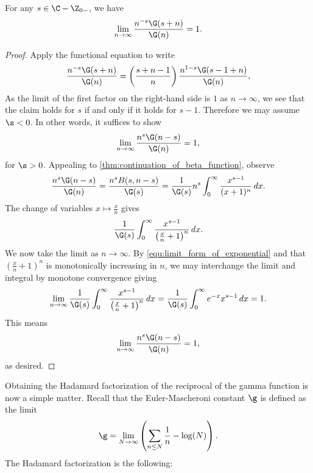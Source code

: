 \documentclass[12pt]{article}
\begin{document}
      \begin{lemma}\label{lem:Hadamard_factorization_of_gamma_function_lemma}
        For any \(s \in \C-\Z_{0-}\), we have
        \[
          \lim_{n \to \infty}\frac{n^{-s}\G(s+n)}{\G(n)} = 1.
        \]
      \end{lemma}
      \begin{proof}
        Apply the functional equation to write
        \[
          \frac{n^{-s}\G(s+n)}{\G(n)} = \left(\frac{s+n-1}{n}\right)\frac{n^{1-s}\G(s-1+n)}{\G(n)},
        \]
        As the limit of the first factor on the right-hand side is \(1\) as \(n \to \infty\), we see that the claim holds for \(s\) if and only if it holds for \(s-1\). Therefore we may assume \(\s < 0\). In other words, it suffices to show
        \[
          \lim_{n \to \infty}\frac{n^{s}\G(n-s)}{\G(n)} = 1,
        \]
        for \(\s > 0\). Appealing to \cref{thm:continuation_of_beta_function}, observe
        \[
          \frac{n^{s}\G(n-s)}{\G(n)} = \frac{n^{s}B(s,n-s)}{\G(s)} = \frac{1}{\G(s)}n^{s}\int_{0}^{\infty}\frac{x^{s-1}}{(x+1)^{n}}\,dx.
        \]
        The change of variables \(x \mapsto \frac{x}{n}\) gives
        \[ 
          \frac{1}{\G(s)}\int_{0}^{\infty}\frac{x^{s-1}}{\left(\frac{x}{n}+1\right)^{n}}\,dx.
        \]
        We now take the limit as \(n \to \infty\). By \cref{equ:limit_form_of_exponential} and that \(\left(\frac{x}{n}+1\right)^{n}\) is monotonically increasing in \(n\), we may interchange the limit and integral by monotone convergence giving
        \[
          \lim_{n \to \infty}\frac{1}{\G(s)}\int_{0}^{\infty}\frac{x^{s-1}}{\left(\frac{x}{n}+1\right)^{n}}\,dx = \frac{1}{\G(s)}\int_{0}^{\infty}e^{-x}x^{s-1}\,dx = 1.
        \]
        This means
        \[
          \lim_{n \to \infty}\frac{n^{s}\G(n-s)}{\G(n)} = 1,
        \]
        as desired.
      \end{proof}

      Obtaining the Hadamard factorization of the reciprocal of the gamma function is now a simple matter. Recall that the Euler-Mascheroni constant \(\g\) is defined as the limit
      \begin{equation}\label{equ:Euler-Mascheroni_constant_definition}
        \g = \lim_{N \to \infty}\left(\sum_{n \le N}\frac{1}{n}-\log(N)\right).
      \end{equation}
      The Hadamard factorization is the following:
\end{document}
